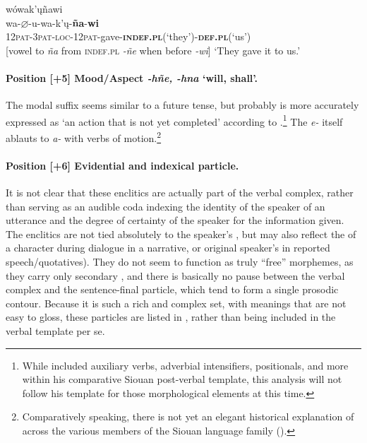 \documentclass[output=paper]{LSP/langsci}
\begin{document}
\begin{exe}
\ex \glll  wówak'\k{u}ñawi  \\
wa-\textbf{$\varnothing$}-u-wa-k'\k{u}-\textbf{ña}-\textbf{wi}    \\
\textsc{12pat-3pat-loc-12pat-}gave-\textbf{\textsc{indef.pl}}(`they')-\textbf{\textsc{def.pl}}(`us')  \\     

[vowel  to \textit{ña} from \textsc{indef.pl} \textit{-ñe} when before \textit{-wi}]
\trans `They gave it to us.'  \citep[240]{Whitman1947}
\end{exe} 

\paragraph*{Position [+5] Mood/Aspect \textit{-hñe, -hna} `will, shall'.}

The modal suffix seems similar to a future tense, but probably is more accurately expressed as `an action that is not yet completed' according to \citet{Rankin2009}.\footnote{While \citet{Rankin2009} included auxiliary verbs, adverbial intensifiers, positionals, and more within his comparative Siouan post-verbal template, this analysis will not follow his template for those morphological elements at this time.}   The \textit{e-} itself ablauts to \textit{a-} with verbs of motion.\footnote{Comparatively speaking, there is not yet an elegant historical explanation of  across the various members of the Siouan language family (\citealt[466-468]{Rankin2005b}).}  

\noindent
\paragraph*{Position [+6]  Evidential and  indexical particle.}

It is not clear that these enclitics are actually part of the verbal complex, rather than serving as an audible coda indexing the  identity of the speaker of an utterance and the degree of certainty of the speaker for the information given. The enclitics are not tied absolutely to the speaker's , but may also reflect the  of a character during dialogue in a narrative, or original speaker's  in reported speech/quotatives).  They do not seem to function as truly ``free'' morphemes, as they carry only secondary , and there is basically no pause between the verbal complex and the sentence-final particle, which tend to form a single prosodic contour.  Because it is such a rich and complex set, with meanings that are not easy to gloss, these particles are listed in , rather than being included in the verbal template per se.   
\end{document}
